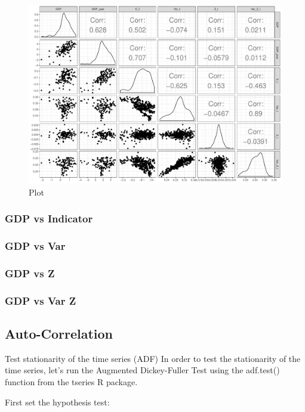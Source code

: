\documentclass[12pt,a4paper,oneside]{book}
\begin{document}
\begin{figure}[H]
    \centering
    \includegraphics[scale=0.5]{Graphs/ggpairs2.pdf}
    \caption{Plot }
    \label{fig:ggpairs2}
\end{figure}

\subsubsection{GDP vs Indicator}

\subsubsection{GDP vs Var}

\subsubsection{GDP vs Z}

\subsubsection{GDP vs Var Z}




\subsection{Auto-Correlation}

Test stationarity of the time series (ADF)
In order to test the stationarity of the time series, let’s run the Augmented Dickey-Fuller Test using the adf.test() function from the tseries R package.

First set the hypothesis test:
\end{document}
